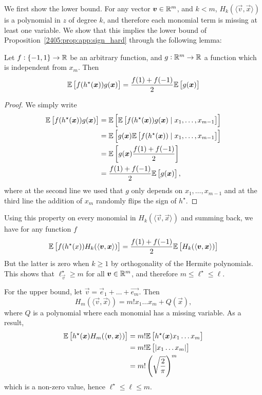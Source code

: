 We first show the lower bound. For any vector ${\boldsymbol{v}}\in \mathbb{R}^m$, and $k < m$, $H_k(\langle \vec{v}, \vec{x} \rangle)$ is a polynomial in $z$ of degree $k$, and therefore each monomial term is missing at least one variable. We show that this implies the lower bound of Proposition~\ref{2405:prop:app:sign_hard} through the following lemma:
\begin{lemma}
  Let $f: \{-1, 1\} \to \mathbb{R}$ be an arbitrary function, and $g: \mathbb{R}^m \to \mathbb{R}$ a function which is independent from $x_m$. Then
  \[ \mathbb{E}\left[f(h^\star({\boldsymbol{x}})) g({\boldsymbol{x}})\right] = \frac{f(1)+f(-1)}{2}\mathbb{E}\left[g({\boldsymbol{x}})\right]\]
\end{lemma}
\begin{proof}
  We simply write
  \begin{align*}
    \mathbb{E}\left[f(h^\star({\boldsymbol{x}})) g({\boldsymbol{x}})\right]
    &= \mathbb{E}\left[\mathbb{E}\left[f(h^\star({\boldsymbol{x}})) g({\boldsymbol{x}}) \mid x_1, \dots, x_{m-1}\right]\right]\\
    &= \mathbb{E}\left[g({\boldsymbol{x}}) \mathbb{E}\left[f(h^\star({\boldsymbol{x}})) \mid x_1, \dots, x_{m-1}\right]\right] \\
    &= \mathbb{E}\left[g({\boldsymbol{x}}) \frac{f(1)+f(-1)}{2}\right] \\
    &=  \frac{f(1)+f(-1)}{2}\mathbb{E}\left[g({\boldsymbol{x}})\right],
  \end{align*}
  where at the second line we used that $g$ only depends on $x_1, \dots, x_{m-1}$ and at the third line the addition of $x_m$ randomly flips the sign of $h^\star$.
\end{proof}

Using this property on every monomial in $H_k(\langle \vec{v}, \vec{x} \rangle)$ and summing back, we have for any function $f$
\begin{equation}
  \mathbb{E}\left[f(h^\star(x)) H_k(\langle {\boldsymbol{v}}, {\boldsymbol{x}} \rangle)\right] = \frac{f(1)+f(-1)}{2}\mathbb{E}\left[H_k(\langle {\boldsymbol{v}}, {\boldsymbol{x}} \rangle)\right]
\end{equation}
But the latter is zero when $k\geq 1$ by orthogonality of the Hermite polynomials. This shows that $\ell_{\vec{v}}^\star \geq m$ for all ${\boldsymbol{v}}\in\mathbb{R}^m$, and therefore $m \leq \ell^\star \leq \ell$.

For the upper bound, let $\vec{v} = \vec{e}_1 + \dots + \vec{e_m}$. Then
\[ H_m(\langle \vec{v}, \vec{x} \rangle) = m!   x_1\dots x_m + Q(\vec{x}), \]
where $Q$ is a polynomial where each monomial has a missing variable. As a result,
\begin{align*}
  \mathbb{E}\left[h^\star({\boldsymbol{x}}) H_m(\langle {\boldsymbol{v}}, {\boldsymbol{x}} \rangle)\right] &= m!  \mathbb{E}\left[h^\star({\boldsymbol{x}}) x_1\dots x_m\right] \\
  &= m!  \mathbb{E}\left[|x_1\dots x_m|\right] \\
  &= m! \left( \sqrt{\frac2\pi} \right)^m
\end{align*}
which is a non-zero value, hence $\ell^\star \leq \ell \leq m$.
